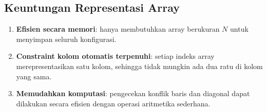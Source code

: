 \documentclass[12pt,a4paper]{article}
\begin{document}
\begin{center}
\label{fig:contoh-state}
\end{center}

\subsection{Keuntungan Representasi Array}
\label{subsec:keuntungan}

\begin{enumerate}[label=\arabic*.]
    \item \textbf{Efisien secara memori}: hanya membutuhkan array berukuran $N$ untuk menyimpan seluruh konfigurasi.
    \item \textbf{Constraint kolom otomatis terpenuhi}: setiap indeks array merepresentasikan satu kolom, sehingga tidak mungkin ada dua ratu di kolom yang sama.
    \item \textbf{Memudahkan komputasi}: pengecekan konflik baris dan diagonal dapat dilakukan secara efisien dengan operasi aritmetika sederhana.
\end{enumerate}

\end{document}
